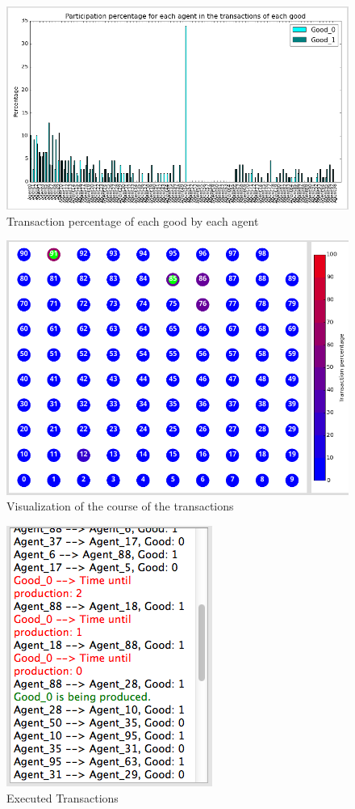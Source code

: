 \documentclass[twoside,openright]{uva-bachelor-thesis}
\begin{document}
\begin{figure}[h]
\centering
\includegraphics[scale=0.4]{Simulation2_figures/Distribution}
\caption{Transaction percentage of each good by each agent}
\end{figure}
\clearpage
\begin{figure}
\centering
\includegraphics[scale=0.4]{Simulation2_figures/Visualization}
\caption{Visualization of the course of the transactions}
\end{figure}

\begin{figure}
\centering
\includegraphics[scale=0.4]{Simulation2_figures/Transactions}
\caption{Executed Transactions}
\end{figure}
\end{document}
